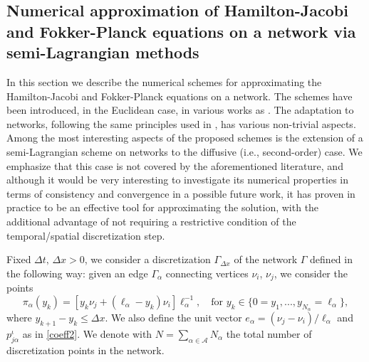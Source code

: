 \documentclass[smallextended,referee,envcountsect,]{svjour3}
\newcommand{\cA}{{\mathcal A}}
\begin{document}
\subsection[Num. approx. of H-J and F-P eq. on a network via semi-Lagrangian methods]{Numerical approximation of Hamilton-Jacobi and Fokker-Planck e\-qua\-tions on a network via semi-Lagrangian methods}
In this section we describe the numerical schemes   for approximating the Ha\-mil\-ton-Jacobi and Fokker-Planck equations on a network. The schemes have been introduced, in the Euclidean case, in various works as \cite{CS17,carlini2016DGA}. The adaptation to networks, following the same principles used in \cite{carlini2020,camilliFesta}, has various non-trivial aspects. {Among the most interesting aspects of the proposed schemes is the extension of a semi-Lagrangian scheme on networks to the diffusive (i.e., second-order) case. We emphasize that this case is not covered by the aforementioned literature, and although it would be very interesting to investigate its numerical properties in terms of consistency and convergence in a possible future work, it has proven in practice to be an effective tool for approximating the solution, with the additional advantage of not requiring a restrictive condition of the temporal/spatial discretization step.}

Fixed $\Delta t,\,\Delta x>0$, we  consider a discretization $\Gamma_{\Delta x}$ of the network $\Gamma$ defined in the following way: given an edge $\Gamma_\alpha$   connecting vertices $\nu_i$, $\nu_j$, we consider the points
$$
	\pi_\alpha(y_k)=[y_k\nu_j+(\ell_\alpha-y_k)\nu_i]\ell_\alpha^{-1},\quad\text{for } y_k\in\{0=y_1,...,y_{N_\alpha}=\ell_\alpha\},
$$
where $y_{k+1}-y_k\leq\Delta x$.  We also define the unit vector $e_\alpha=(\nu_j-\nu_i)/\ell_\alpha$ and
$p^\iota_{j\alpha}$ as in   \eqref{coeff2}. We denote with $N=\sum_{\alpha\in \cA}N_\alpha$ the total number of discretization points in the network. 
\end{document}
